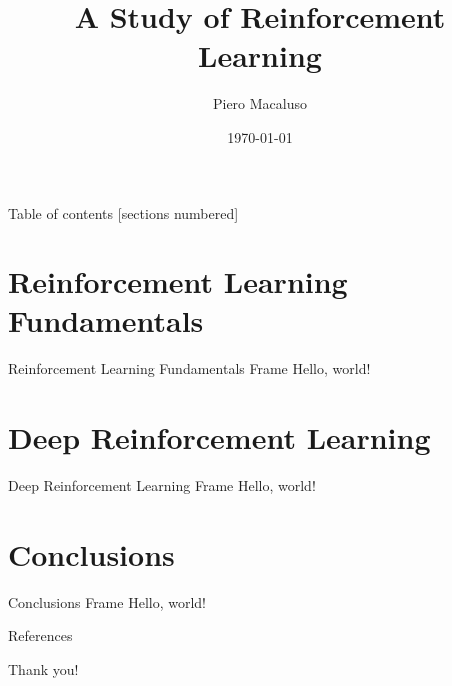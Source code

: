 \documentclass{beamer}
\title{A Study of Reinforcement Learning}
\date{\today}
\author{Piero Macaluso}
\begin{document}
  \maketitle
  \begin{frame}{Table of contents}
  [sections numbered]
  \tableofcontents[hideallsubsections]
\end{frame}
  \section{Reinforcement Learning Fundamentals}
	  \begin{frame}{Reinforcement Learning Fundamentals Frame}
	    Hello, world!
	  \end{frame}
  \section{Deep Reinforcement Learning}
	  \begin{frame}{Deep Reinforcement Learning Frame}
	  	Hello, world!
	  \end{frame}
  \section{Conclusions}
  	\begin{frame}{Conclusions Frame}
  		Hello, world!
	\end{frame}

	\begin{frame}[allowframebreaks]{References}
	
	
	
	
	\end{frame}
	\begin{frame}[standout]
	Thank you!
	\end{frame}
\end{document}
